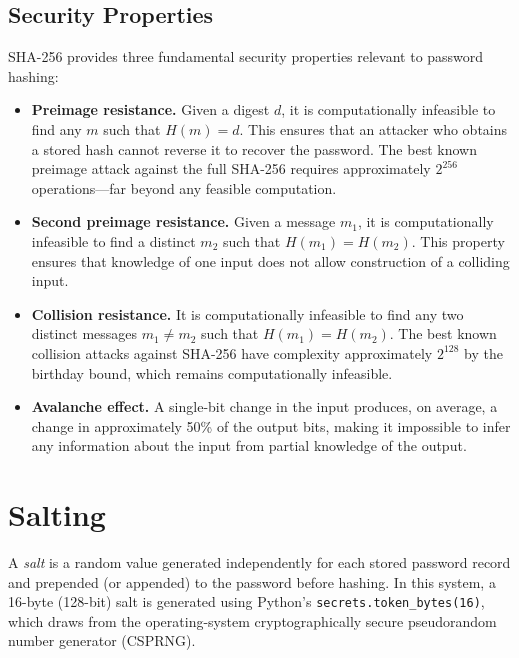 \subsection{Security Properties}
\label{sec:theory_sha256_properties}

SHA-256 provides three fundamental security properties relevant to password hashing:

\begin{itemize}
  \item \textbf{Preimage resistance.} Given a digest $d$, it is computationally infeasible to find any $m$ such that $H(m) = d$. This ensures that an attacker who obtains a stored hash cannot reverse it to recover the password. The best known preimage attack against the full SHA-256 requires approximately $2^{256}$ operations---far beyond any feasible computation.

  \item \textbf{Second preimage resistance.} Given a message $m_1$, it is computationally infeasible to find a distinct $m_2$ such that $H(m_1) = H(m_2)$. This property ensures that knowledge of one input does not allow construction of a colliding input.

  \item \textbf{Collision resistance.} It is computationally infeasible to find any two distinct messages $m_1 \neq m_2$ such that $H(m_1) = H(m_2)$. The best known collision attacks against SHA-256 have complexity approximately $2^{128}$ by the birthday bound, which remains computationally infeasible.

  \item \textbf{Avalanche effect.} A single-bit change in the input produces, on average, a change in approximately 50\% of the output bits, making it impossible to infer any information about the input from partial knowledge of the output.
\end{itemize}

\section{Salting}
\label{sec:theory_salting}

A \emph{salt} is a random value generated independently for each stored password record and prepended (or appended) to the password before hashing. In this system, a 16-byte (128-bit) salt is generated using Python's \texttt{secrets.token\_bytes(16)}, which draws from the operating-system cryptographically secure pseudorandom number generator (CSPRNG).

